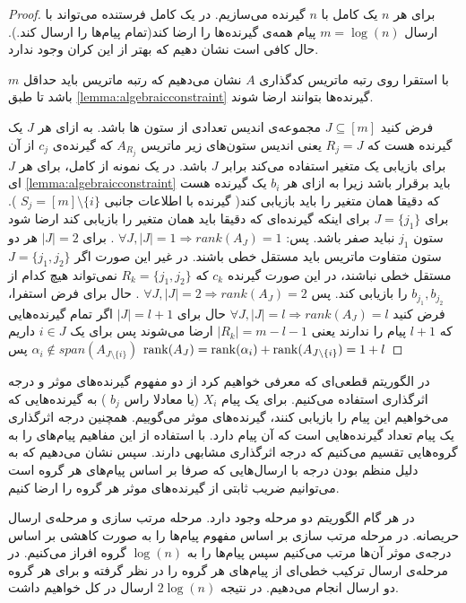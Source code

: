 \begin{proof}
	برای هر
	$n$
	یک 
	\picod
	کامل با
	$n$
	گیرنده می‌سازیم. در یک 
	\picod
	کامل فرستنده می‌تواند با ارسال
	$m = \log(n)$
	پیام همه‌ی گیرنده‌ها را ارضا کند(تمام پیام‌ها را ارسال کند.). حال کافی است نشان دهیم که بهتر از این کران وجود ندارد.
	
	با استقرا روی رتبه ماتریس کدگذاری 
	$A$
	نشان می‌دهیم که رتبه ماتریس باید حداقل 
	$m$
	باشد تا طبق
	\autoref{lemma:algebraicconstraint}
	گیرنده‌ها بتوانند ارضا شوند.
	
	فرض کنید
	$J \subseteq [m]$
	مجموعه‌ی اندیس تعدادی از ستون ها باشد. به ازای هر
	$J$
	یک گیرنده هست که 
	$R_j = J$
	یعنی اندیس ستون‌های زیر ماتریس
	$A_{R_j}$
	که گیرنده‌ی
	$c_j$
	از آن برای بازیابی یک متغیر استفاده می‌کند برابر
	$J$
	باشد. در یک نمونه از
		\picod
		کامل، برای هر
		$J$
		ای 
			\autoref{lemma:algebraicconstraint}
			باید برقرار باشد زیرا به ازای هر
			$b_i$
			یک گیرنده هست که دقیقا همان متغیر را باید بازیابی کند(
			گیرنده با اطلاعات جانبی
			$S_j = [m] \setminus \{i\}$
			). برای
			$J = \{j_1\}$
			برای اینکه گیرنده‌ای که دقیقا باید همان متغیر را بازیابی کند ارضا شود ستون
			$j_1$
			نباید صفر باشد. پس: 
			$\forall J, |J| = 1 \Rightarrow rank(A_J) = 1$
			. برای
			$|J| = 2$
			هر دو ستون متفاوت ماتریس باید مستقل خطی باشند. در غیر این صورت اگر
			$J = \{j_1, j_2\}$
			مستقل خطی نباشند، در این صورت گیرنده‌
			$c_k$
			که
			$R_k = \{j_1, j_2\}$
			نمی‌تواند هیچ کدام از 
			$b_{j_1}, b_{j_2}$
			را بازیابی کند. پس 
		$\forall J, |J| = 2 \Rightarrow rank(A_J) = 2$
		. حال برای فرض استفرا، فرض کنید
		$\forall J, |J| = l \Rightarrow rank(A_J) = l$
		حال برای
		$|J| = l + 1$
		اگر تمام گیرنده‌هایی که
		$l + 1$
		پیام را ندارند یعنی
		$|R_k| = m - l - 1 $
		ارضا می‌شوند پس برای یک
		$i \in J$
		داریم
		$\alpha_i \notin span(A_{J \setminus \{i\}})$
		پس
		$\operatorname{rank}(A_{J}) = \operatorname{rank}(\alpha_i) + \operatorname{rank}(A_{J \setminus \{i\}}) = 1 + l$
\end{proof}
در الگوریتم قطعی‌ای که معرفی خواهیم کرد از دو مفهوم گیرنده‌های موثر و درجه اثرگذاری استفاده می‌کنیم. برای یک پیام
$X_i$
(یا معادلا راس
$b_j$
)
به گیرنده‌هایی که می‌خواهیم این پیام را بازیابی کنند، گیرنده‌های موثر می‌گوییم. همچنین درجه اثرگذاری یک پیام تعداد گیرنده‌هایی است که آن پیام دارد. با استفاده از این مفاهیم پیام‌های را به گروه‌هایی تقسیم می‌کنیم که درجه اثرگذاری مشابهی دارند. سپس نشان می‌دهیم که به دلیل منظم بودن درجه با ارسال‌هایی که صرفا بر اساس پیام‌های هر گروه است می‌توانیم ضریب ثابتی از گیرنده‌های موثر هر گروه را ارضا کنیم.

در هر گام الگوریتم
دو مرحله وجود دارد. مرحله مرتب سازی و مرحله‌ی ارسال حریصانه. در مرحله مرتب سازی بر اساس مفهوم پیام‌ها را به صورت کاهشی بر اساس درجه‌ی موثر آن‌ها مرتب می‌کنیم سپس پیام‌ها را به 
$\log(n)$
گروه افراز می‌کنیم. در مرحله‌ی ارسال ترکیب خطی‌ای از پیام‌های هر گروه را در نظر گرفته و برای هر گروه دو ارسال انجام می‌دهیم. در نتیجه
$2 \log(n)$
ارسال در کل خواهیم داشت.

